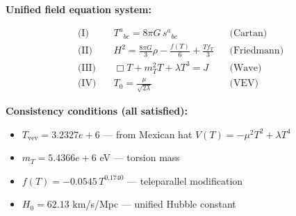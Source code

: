 
\textbf{Unified field equation system:}

\begin{align}
  \text{(I)} \quad & T^a{}_{bc} = 8\pi G \, s^a{}_{bc} && \text{(Cartan)} \\
  \text{(II)} \quad & H^2 = \frac{8\pi G}{3}\rho - \frac{f(T)}{6} + \frac{Tf_T}{3} && \text{(Friedmann)} \\
  \text{(III)} \quad & \Box T + m_T^2 T + \lambda T^3 = J && \text{(Wave)} \\
  \text{(IV)} \quad & T_0 = \frac{\mu}{\sqrt{2\lambda}} && \text{(VEV)}
\end{align}

\textbf{Consistency conditions (all satisfied):}
\begin{itemize}
  \item $T_{\text{vev}} = 3.2327e+6$ — from Mexican hat $V(T) = -\mu^2 T^2 + \lambda T^4$
  \item $m_T = 5.4366e+6$ eV — torsion mass
  \item $f(T) = -0.0545 \, T^{0.1740}$ — teleparallel modification
  \item $H_0 = 62.13$ km/s/Mpc — unified Hubble constant
\end{itemize}